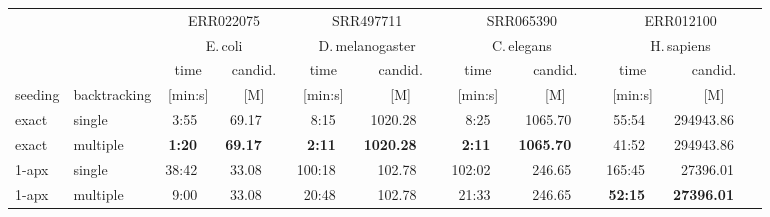 \begin{tabular}{llrrrrrrrr}
\toprule

  & \multirow{2}{*}{}  &\multicolumn{ 2 }{c}{  ERR022075 } &\multicolumn{ 2 }{c}{  SRR497711 } &\multicolumn{ 2 }{c}{  SRR065390 } &\multicolumn{ 2 }{c}{  ERR012100 } \\
  &&\multicolumn{2}{c}{E.\,coli}&\multicolumn{2}{c}{D.\,melanogaster}&\multicolumn{2}{c}{C.\,elegans}&\multicolumn{2}{c}{H.\,sapiens} \\
  \cmidrule(lr){3-4}\cmidrule(lr){5-6}\cmidrule(lr){7-8}\cmidrule(lr){9-10} 
  
  & &\multicolumn{1}{c}{  time } &\multicolumn{1}{c}{  candid. } &\multicolumn{1}{c}{  time } &\multicolumn{1}{c}{  candid. } &\multicolumn{1}{c}{  time } &\multicolumn{1}{c}{  candid. } &\multicolumn{1}{c}{  time } &\multicolumn{1}{c}{  candid. } \\
  seeding & backtracking  &\multicolumn{1}{c}{  [min:s] } &\multicolumn{1}{c}{  [M] } &\multicolumn{1}{c}{  [min:s] } &\multicolumn{1}{c}{  [M] } &\multicolumn{1}{c}{  [min:s] } &\multicolumn{1}{c}{  [M] } &\multicolumn{1}{c}{  [min:s] } &\multicolumn{1}{c}{  [M] } \\

\midrule

exact  &  single    & \phantom{000}3:55\ \  & 69.17\ \ \  & \phantom{000}8:15\ \  & 1020.28\ \ \  & \phantom{000}8:25\ \  & 1065.70\ \ \  & \phantom{00}55:54\ \  & 294943.86\ \ \  \\ 
exact  &  multiple  & \phantom{000}\textbf{1:20}\ \  & \textbf{69.17}\ \ \  & \phantom{000}\textbf{2:11}\ \  & \textbf{1020.28}\ \ \  & \phantom{000}\textbf{2:11}\ \  & \textbf{1065.70}\ \ \  & \phantom{00}41:52\ \  & 294943.86\ \ \  \\

\midrule

1-apx &  single     & \phantom{00}38:42\ \  & 33.08\ \ \  & \phantom{0}100:18\ \  & 102.78\ \ \  & \phantom{0}102:02\ \  & 246.65\ \ \  & \phantom{0}165:45\ \  & 27396.01\ \ \  \\ 
1-apx &  multiple   & \phantom{00}9:00\ \  & 33.08\ \ \  & \phantom{00}20:48\ \  & 102.78\ \ \  & \phantom{00}21:33\ \  & 246.65\ \ \  & \phantom{00}\textbf{52:15}\ \  & \textbf{27396.01}\ \ \  \\ 
\bottomrule
\end{tabular}

